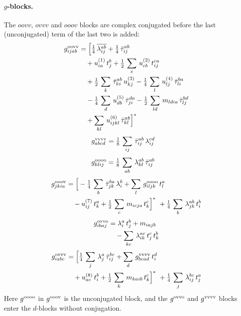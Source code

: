\documentclass[11pt]{article}
\begin{document}
\paragraph{$g$-blocks.} The $oovv$, $ovvv$ and $ooov$ blocks are complex conjugated before the last (unconjugated) term of
the last two is added:
\begin{align*}
  g^{\rm oovv}_{ijab} &= \Big[\tfrac{1}{4}\, \overline{\lambda_{ij}^{ab}} + \tfrac{1}{4}\, \bar\tau_{ij}^{ab} \notag\\
  & \quad +  u^{(1)}_{ia}\,t_{j}^{b} + \tfrac{1}{2}\, \sum_{c}\,u^{(2)}_{cb}\,t_{ij}^{ca} \notag\\
  & \quad + \tfrac{1}{2}\, \sum_{k}\,\bar\tau_{ki}^{ab}\,u^{(3)}_{kj} - \tfrac{1}{4}\, \sum_{l}\,u^{(4)}_{lj}\,\bar\tau_{li}^{ba} \notag\\
  & \quad - \tfrac{1}{4}\, \sum_{d}\,u^{(5)}_{db}\,\bar\tau_{ji}^{da} - \tfrac{1}{2}\, \sum_{ld}\,m_{ldia}\,\bar\tau_{lj}^{bd} \notag\\
  & \quad +  \sum_{kl}\,u^{(6)}_{ijkl}\,\bar\tau_{kl}^{ab}\Big]^{*}
\end{align*}
\begin{align*}
  g^{\rm vvvv}_{abcd} &= \tfrac{1}{8}\, \sum_{ij}\,\bar\tau_{ij}^{ab}\,\lambda_{ij}^{cd}
\end{align*}
\begin{align*}
  g^{\rm oooo}_{klij} &= \tfrac{1}{8}\, \sum_{ab}\,\lambda_{kl}^{ab}\,\bar\tau_{ij}^{ab}
\end{align*}
\begin{align*}
  g^{\rm ooov}_{jkia} &= \Big[- \tfrac{1}{4}\, \sum_{b}\,\bar\tau_{jk}^{ba}\,\lambda_{i}^{b} +  \sum_{l}\,g^{\rm oooo}_{iljk}\,t_{l}^{a} \notag\\
  & \quad -  u^{(7)}_{ij}\,t_{k}^{a} + \tfrac{1}{2}\, \sum_{c}\,m_{icja}\,t_{k}^{c}\Big]^{*}\ + \tfrac{1}{4}\, \sum_{b}\,\lambda_{jk}^{ab}\,t_{i}^{b}
\end{align*}
\begin{align*}
  g^{\rm ovvo}_{ibaj} &=  \lambda_{i}^{a}\,t_{j}^{b} +  m_{iajb} \notag\\
  & \quad -  \sum_{kc}\,\lambda_{ik}^{ac}\,t_{j}^{c}\,t_{k}^{b}
\end{align*}
\begin{align*}
  g^{\rm ovvv}_{iabc} &= \Big[\tfrac{1}{4}\, \sum_{j}\,\lambda_{j}^{a}\,\bar\tau_{ij}^{bc} +  \sum_{d}\,g^{\rm vvvv}_{bcad}\,t_{i}^{d} \notag\\
  & \quad +  u^{(8)}_{ac}\,t_{i}^{b} + \tfrac{1}{2}\, \sum_{k}\,m_{kaib}\,t_{k}^{c}\Big]^{*}\ + \tfrac{1}{4}\, \sum_{j}\,\lambda_{ij}^{bc}\,t_{j}^{a}
\end{align*}
Here $g^{\rm oooo}$ in $g^{\rm ooov}$ is the unconjugated block, and the $g^{\rm ovvo}$ and $g^{\rm vvvv}$ blocks
enter the $d$-blocks without conjugation.
\end{document}
